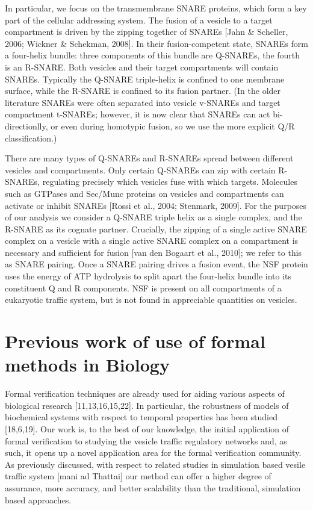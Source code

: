 \documentclass[preprint,12pt]{elsarticle}
\begin{document}
In particular, we focus on the transmembrane SNARE proteins, which form a key part of the cellular addressing system. The fusion of a vesicle to a target compartment is driven by the zipping together of SNAREs [Jahn \& Scheller, 2006; Wickner \& Schekman, 2008]. In their fusion-competent state, SNAREs form a four-helix bundle: three components of this bundle are Q-SNAREs, the fourth is an R-SNARE. Both vesicles and their target compartments will contain SNAREs. Typically the Q-SNARE triple-helix is confined to one membrane surface, while the R-SNARE is confined to its fusion partner. (In the older literature SNAREs were often separated into vesicle v-SNAREs and target compartment t-SNAREs; however, it is now clear that SNAREs can act bi-directionlly, or even during homotypic fusion, so we use the more explicit Q/R classification.)

There are many types of Q-SNAREs and R-SNAREs spread between different vesicles and compartments. Only certain Q-SNAREs can zip with certain R-SNAREs, regulating precisely which vesicles fuse with which targets. Molecules such as GTPases and Sec/Munc proteins on vesicles and compartments can activate or inhibit SNAREs [Rossi et al., 2004; Stenmark, 2009]. For the purposes of our analysis we consider a Q-SNARE triple helix as a single complex, and the R-SNARE as its cognate partner. Crucially, the zipping of a single active SNARE complex on a vesicle with a single active SNARE complex on a compartment is necessary and sufficient for fusion [van den Bogaart et al., 2010]; we refer to this as SNARE pairing. Once a SNARE pairing drives a fusion event, the NSF protein uses the energy of ATP hydrolysis to split apart the four-helix bundle into its constituent Q and R components. NSF is present on all compartments of a eukaryotic traffic system, but is not found in appreciable quantities on vesicles.


\section{Previous work of use of formal methods in Biology}

Formal verification techniques are already used for aiding various
aspects of biological research [11,13,16,15,22]. In particular, the robustness of models of biochemical systems with respect to temporal properties has been studied [18,6,19]. Our work is, to the best of our knowledge, the initial application of formal verification to studying the vesicle traffic regulatory networks and, as such, it opens up a novel application area for the formal verification community. As previously discussed, with respect to related studies in simulation based vesile traffic system [mani ad Thattai] our method can offer a higher degree of assurance, more accuracy, and better scalability than the traditional, simulation based approaches. 
\end{document}
